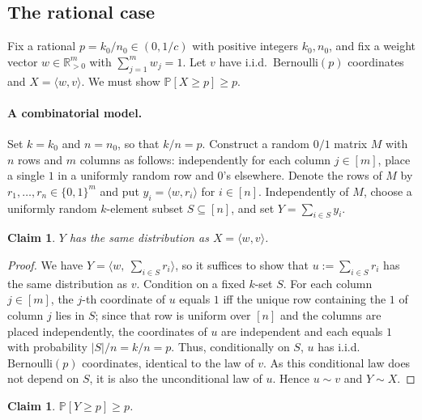 \documentclass[11pt]{amsart}
\theoremstyle{plain}
\newtheorem{claim}[theorem]{Claim}
\def\bR{\mathbb{R}}
\def\Pb{\mathbb{P}}
\begin{document}
\subsection{The rational case}

Fix a rational $p=k_0/n_0\in(0,1/c)$ with positive integers $k_0,n_0$, and fix a
weight vector $w\in\bR_{>0}^m$ with $\sum_{j=1}^m w_j=1$. Let $v$ have i.i.d.\
$\mathrm{Bernoulli}(p)$ coordinates and $X=\langle w,v\rangle$. We must show
$\Pb[X\ge p]\ge p$.

\paragraph{A combinatorial model.}
Set $k=k_0$ and $n=n_0$, so that $k/n=p$. Construct a random $0/1$ matrix $M$ with
$n$ rows and $m$ columns as follows: independently for each column
$j\in[m]$, place a single $1$ in a uniformly random row and $0$'s elsewhere.
Denote the rows of $M$ by $r_1,\dots,r_n\in\{0,1\}^m$ and put
$y_i=\langle w,r_i\rangle$ for $i\in[n]$. Independently of $M$, choose a uniformly
random $k$-element subset $S\subseteq[n]$, and set $Y=\sum_{i\in S}y_i$.

\begin{claim}\label{cl:dist}
$Y$ has the same distribution as $X=\langle w,v\rangle$.
\end{claim}

\begin{proof}
We have $Y=\big\langle w,\ \sum_{i\in S}r_i\big\rangle$, so it suffices to show that
$u:=\sum_{i\in S}r_i$ has the same distribution as $v$. Condition on a fixed
$k$-set $S$. For each column $j\in[m]$, the $j$-th coordinate of $u$ equals $1$
iff the unique row containing the $1$ of column $j$ lies in $S$; since that row is
uniform over $[n]$ and the columns are placed independently, the coordinates of
$u$ are independent and each equals $1$ with probability $|S|/n=k/n=p$. Thus,
conditionally on $S$, $u$ has i.i.d.\ $\mathrm{Bernoulli}(p)$ coordinates,
identical to the law of $v$. As this conditional law does not depend on $S$, it is
also the unconditional law of $u$. Hence $u\sim v$ and $Y\sim X$.
\end{proof}

\begin{claim}\label{cl:bound}
$\Pb[Y\ge p]\ge p$.
\end{claim}
\end{document}
